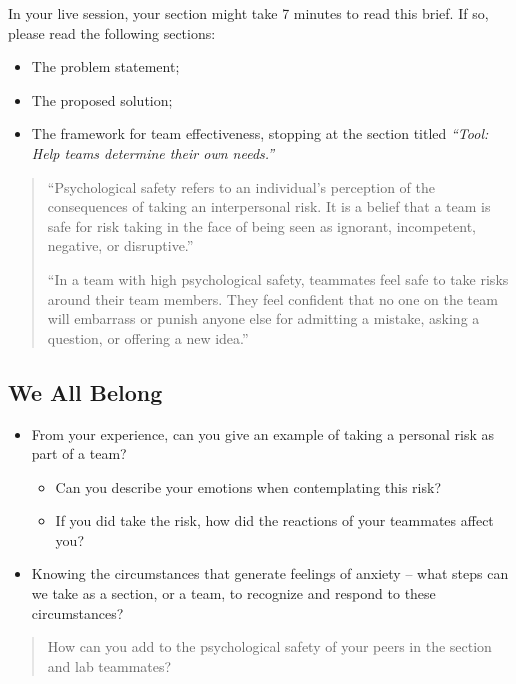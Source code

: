 \documentclass[
]{book}
\providecommand{\tightlist}{%
  \setlength{\itemsep}{0pt}\setlength{\parskip}{0pt}}
\theoremstyle{definition}
\theoremstyle{definition}
\theoremstyle{definition}
\theoremstyle{definition}
\theoremstyle{remark}
\begin{document}
In your live session, your section might take 7 minutes to read this brief. If so, please read the following sections:

\begin{itemize}
\tightlist
\item
  The problem statement;
\item
  The proposed solution;
\item
  The framework for team effectiveness, stopping at the section titled \emph{``Tool: Help teams determine their own needs.''}
\end{itemize}

\begin{quote}
``Psychological safety refers to an individual's perception of the consequences of taking an interpersonal risk. It is a belief that a team is safe for risk taking in the face of being seen as ignorant, incompetent, negative, or disruptive.''

``In a team with high psychological safety, teammates feel safe to take risks around their team members. They feel confident that no one on the team will embarrass or punish anyone else for admitting a mistake, asking a question, or offering a new idea.''
\end{quote}

\hypertarget{we-all-belong}{%
\subsection{We All Belong}\label{we-all-belong}}

\begin{itemize}
\tightlist
\item
  From your experience, can you give an example of taking a personal risk as part of a team?

  \begin{itemize}
  \tightlist
  \item
    Can you describe your emotions when contemplating this risk?
  \item
    If you did take the risk, how did the reactions of your teammates affect you?
  \end{itemize}
\item
  Knowing the circumstances that generate feelings of anxiety -- what steps can we take as a section, or a team, to recognize and respond to these circumstances?
\end{itemize}

\begin{quote}
How can you add to the psychological safety of your peers in the section and lab teammates?
\end{quote}
\end{document}

